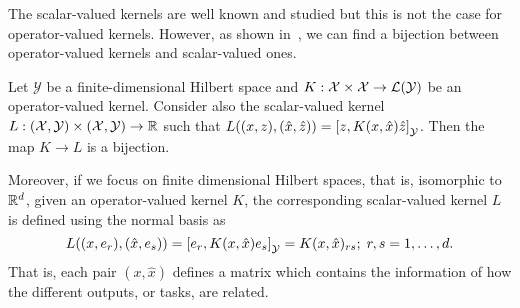The scalar-valued kernels are well known and studied but this is not the case for operator-valued kernels. However, as shown in~\cite{Hein04kernels,BaldassarreRBV12}, we can find a bijection between operator-valued kernels and scalar-valued ones.
\begin{lemma}\label{lemma:kernel_bijection}
    Let $\mathcal{Y}$ be a finite-dimensional Hilbert space and
    $K: \mathcal{X} \times \mathcal{X} \to \mathcal{L}(\mathcal{Y})$
    be an operator-valued kernel. Consider also the scalar-valued kernel
    $L: (\mathcal{X}, \mathcal{Y}) \times (\mathcal{X}, \mathcal{Y}) \to \mathbb{R}$
    such that $L((x, z), (\hat{x}, \hat{z})) = \left[ z, K(x, \hat{x}) \hat{z} \right]_\mathcal{Y}$. Then the map $K \to L$ is a bijection.
\end{lemma}
Moreover, if we focus on finite dimensional Hilbert spaces, that is, isomorphic to $\mathbb{R}^d$, given an operator-valued kernel $K$, the corresponding scalar-valued kernel $L$ is defined using the normal basis as
$$ L((x, e_r), (\hat{x}, e_s)) = \left[ e_r, K(x, \hat{x}) e_s \right]_\mathcal{Y} = K(x, \hat{x})_{rs} ; \; r,s=1, \ldots, d.$$
That is, each pair $(x, \hat{x})$ defines a matrix which contains the information of how the different outputs, or tasks, are related.



